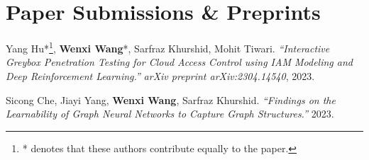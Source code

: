 \section{Paper Submissions \& Preprints}
\vspace{-3ex}




\renewcommand{\refname}{\vspace{-1cm}}

\begin{thebibliography}{99} %
	

	
	Yang Hu*\footnote{* denotes that these authors contribute equally to the paper.\label{note2}}, \textbf{Wenxi Wang}*, Sarfraz Khurshid, Mohit Tiwari.
	\emph{``Interactive Greybox Penetration Testing for Cloud Access Control using IAM Modeling and Deep Reinforcement Learning.''}
	\textit{arXiv preprint arXiv:2304.14540}, 2023. 	\href{https://arxiv.org/pdf/2304.14540.pdf}{\color{color1}{\textbf{[PDF]}}}
	
	Sicong Che, Jiayi Yang, \textbf{Wenxi Wang}, Sarfraz Khurshid.
	\emph{``Findings on the Learnability of Graph Neural Networks to Capture Graph Structures.''}
	2023.
	
\end{thebibliography}



